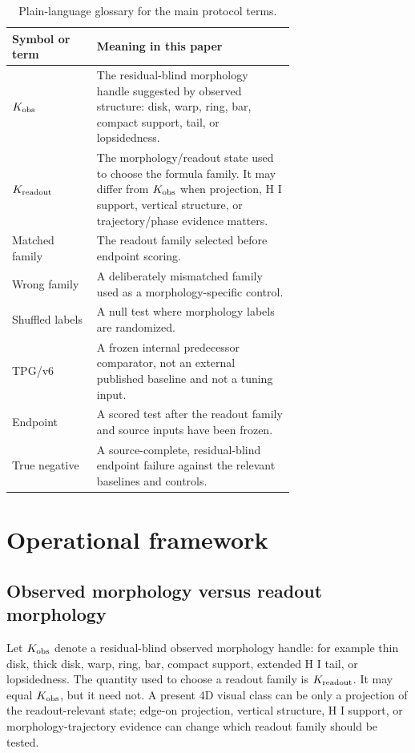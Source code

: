 \documentclass[11pt]{article}
\begin{document}
\begin{table}[H]
\centering
\caption{Plain-language glossary for the main protocol terms.}
\small
\begin{tabular}{lp{0.70\linewidth}}
\toprule
Symbol or term & Meaning in this paper\\
\midrule
\(K_{\rm obs}\) & The residual-blind morphology handle suggested by observed
structure: disk, warp, ring, bar, compact support, tail, or lopsidedness.\\
\(K_{\rm readout}\) & The morphology/readout state used to choose the formula
family.  It may differ from \(K_{\rm obs}\) when projection, H I support,
vertical structure, or trajectory/phase evidence matters.\\
Matched family & The readout family selected before endpoint scoring.\\
Wrong family & A deliberately mismatched family used as a morphology-specific
control.\\
Shuffled labels & A null test where morphology labels are randomized.\\
TPG/v6 & A frozen internal predecessor comparator, not an external published
baseline and not a tuning input.\\
Endpoint & A scored test after the readout family and source inputs have been
frozen.\\
True negative & A source-complete, residual-blind endpoint failure against the
relevant baselines and controls.\\
\bottomrule
\end{tabular}
\end{table}

\section{Operational framework}

\subsection{Observed morphology versus readout morphology}

Let \(K_{\rm obs}\) denote a residual-blind observed morphology handle: for
example thin disk, thick disk, warp, ring, bar, compact support, extended H I
tail, or lopsidedness.  The quantity used to choose a readout family is
\(K_{\rm readout}\).  It may equal \(K_{\rm obs}\), but it need not.  A present
4D visual class can be only a projection of the readout-relevant state; edge-on
projection, vertical structure, H I support, or morphology-trajectory evidence can
change which readout family should be tested.
\end{document}
